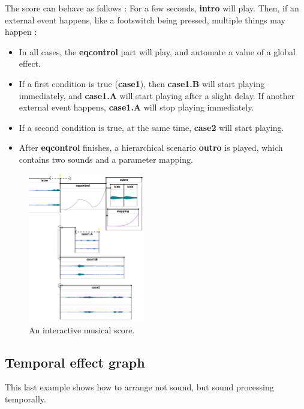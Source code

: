 \documentclass{article}
\begin{document}
The score can behave as follows : 
For a few seconds, \textbf{intro} will play.  
Then, if an external event happens, like a footswitch being pressed, 
multiple things may happen : 
\begin{itemize}
    \item In all cases, the \textbf{eqcontrol} part will play, and automate a value of a global effect.
    \item If a first condition is true (\textbf{case1}), then \textbf{case1.B} will start playing immediately, and \textbf{case1.A} will start playing after a slight delay. If another external event happens, \textbf{case1.A} will stop playing immediately.
    \item If a second condition is true, at the same time, \textbf{case2} will start playing.
    \item After \textbf{eqcontrol} finishes, a hierarchical scenario \textbf{outro} is played, which contains two sounds and a parameter mapping.
\end{itemize}

\begin{figure}[h]
    \centering
    \includegraphics[width=0.45\textwidth]{figures/ex2.png}
    \caption{An interactive musical score.}
    \label{fig.score2}
\end{figure}

\subsection{Temporal effect graph}
This last example shows how to arrange not sound, but sound processing temporally.
\end{document}
